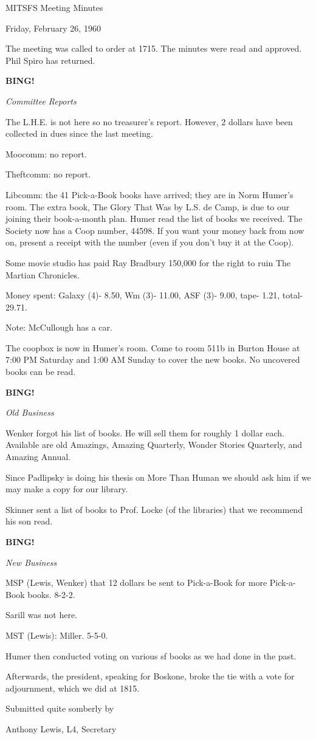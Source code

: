 \documentclass[12pt]{article}
\newcommand{\bing}{{\bf BING!} }
\newcommand{\goto}[1]{\bing \vskip 12pt \centerline{{\em{#1}}}}
\begin{document}
\begin{center}

MITSFS Meeting Minutes

Friday, February 26, 1960

\end{center}
 
\vspace{12pt}

\setlength{\parskip}{6pt}

\noindent
The meeting was called to order at 1715. The minutes were read and approved. Phil Spiro has returned.

\goto{Committee Reports}

The L.H.E. is not here so no treasurer's report. However, 2 dollars have been collected in dues since the last meeting.

Moocomm: no report.

Theftcomm: no report.

Libcomm: the 41 Pick-a-Book books have arrived; they are in Norm Humer's room. The extra book, The Glory That Was by L.S. de Camp, is due to our joining their book-a-month plan. Humer read the list of books we received. The Society now has a Coop number, 44598. If you want your money back from now on, present a receipt with the number (even if you don't buy it at the Coop).

Some movie studio has paid Ray Bradbury 150,000 for the right to ruin The Martian Chronicles.

Money spent: Galaxy (4)- 8.50, Wm (3)- 11.00, ASF (3)- 9.00, tape- 1.21, total- 29.71.

Note: McCullough has a car.

The coopbox is now in Humer's room. Come to room 511b in Burton House at 7:00 PM Saturday and 1:00 AM Sunday to cover the new books. No uncovered books can be read.

\goto{Old Business}

Wenker forgot his list of books. He will sell them for roughly 1 dollar each. Available are old Amazings, Amazing Quarterly, Wonder Stories Quarterly, and Amazing Annual.

Since Padlipsky is doing his thesis on More Than Human we should ask him if we may make a copy for our library.

Skinner sent a list of books to Prof. Locke (of the libraries) that we recommend his son read.

\goto{New Business}

MSP (Lewis, Wenker) that 12 dollars be sent to Pick-a-Book for more Pick-a-Book books. 8-2-2.

Sarill was not here.

MST (Lewis): Miller. 5-5-0.

Humer then conducted voting on various sf books as we had done in the past.

Afterwards, the president, speaking for Boskone, broke the tie with a vote for adjournment, which we did at 1815.

\vspace{12pt}

\centerline{Submitted quite somberly by}
\centerline{Anthony Lewis, L4, Secretary}
\end{document}
